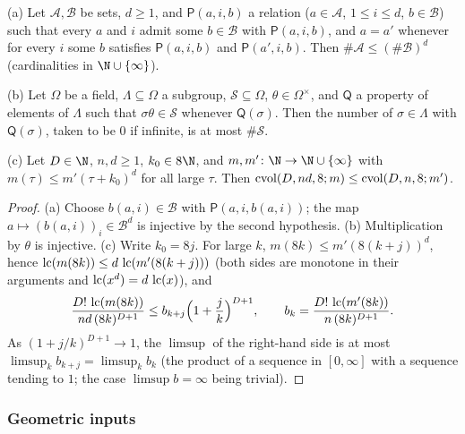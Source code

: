 \begin{lemma}\label{lem:pf:deepstr:counting}
\textup{(a)} Let $\mathcal A,\mathcal B$ be sets, $d\ge1$, and $\mathsf P(a,i,b)$ a relation ($a\in\mathcal A$,
$1\le i\le d$, $b\in\mathcal B$) such that every $a$ and $i$ admit some $b\in\mathcal B$ with $\mathsf P(a,i,b)$, and
$a=a'$ whenever for every $i$ some $b$ satisfies $\mathsf P(a,i,b)$ and $\mathsf P(a',i,b)$. Then
$\#\mathcal A\le(\#\mathcal B)^d$ (cardinalities in $\N\cup\{\infty\}$).

\textup{(b)} Let $\Omega$ be a field, $\Lambda\subseteq\Omega$ a subgroup, $\mathcal S\subseteq\Omega$, $\theta\in\Omega^\times$, and $\mathsf Q$ a
property of elements of $\Lambda$ such that $\sigma\theta\in\mathcal S$ whenever $\mathsf Q(\sigma)$. Then the number of
$\sigma\in\Lambda$ with $\mathsf Q(\sigma)$, taken to be $0$ if infinite, is at most $\#\mathcal S$.

\textup{(c)} Let $D\in\N$, $n,d\ge1$, $k_0\in8\N$, and
$m,m'\colon\N\to\N\cup\{\infty\}$ with $m(\tau)\le m'(\tau+k_0)^d$ for all large $\tau$. Then
$\operatorname{cvol}(D,nd,8;m)\le\operatorname{cvol}(D,n,8;m')$.
\end{lemma}

\begin{proof}
(a) Choose $b(a,i)\in\mathcal B$ with $\mathsf P(a,i,b(a,i))$; the map $a\mapsto(b(a,i))_i\in\mathcal B^d$ is injective
by the second hypothesis. (b) Multiplication by $\theta$ is injective. (c) Write $k_0=8j$. For large $k$,
$m(8k)\le m'(8(k+j))^d$, hence $\operatorname{lc}(m(8k))\le d\,\operatorname{lc}(m'(8(k+j)))$ (both sides are
monotone in their arguments and $\operatorname{lc}(x^d)=d\,\operatorname{lc}(x)$), and
\[
\frac{D!\,\operatorname{lc}(m(8k))}{nd\,(8k)^{D+1}}\le b_{k+j}\Bigl(1+\frac jk\Bigr)^{D+1},\qquad
b_k=\frac{D!\,\operatorname{lc}(m'(8k))}{n\,(8k)^{D+1}}.
\]
As $(1+j/k)^{D+1}\to1$, the $\limsup$ of the right-hand side is at most $\limsup_kb_{k+j}=\limsup_kb_k$
(the product of a sequence in $[0,\infty]$ with a sequence tending to $1$; the case $\limsup b=\infty$ being
trivial).
\end{proof}

\subsubsection*{Geometric inputs}

